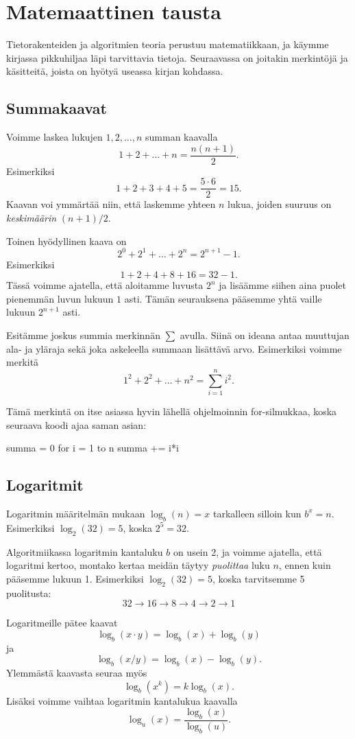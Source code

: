 \section{Matemaattinen tausta}

Tietorakenteiden ja algoritmien teoria perustuu matematiikkaan,
ja käym\-me kirjassa pikkuhiljaa läpi tarvittavia tietoja.
Seuraavassa on joitakin merkintöjä ja käsitteitä, joista on hyötyä
useassa kirjan kohdassa.

\subsection{Summakaavat}

Voimme laskea lukujen $1,2,\dots,n$ summan kaavalla
\[1+2+\dots+n = \frac{n(n+1)}{2}.\]
Esimerkiksi
\[1+2+3+4+5 = \frac{5 \cdot 6}{2}=15.\]
Kaavan voi ymmärtää niin, että laskemme yhteen $n$ lukua,
joiden suuruus on \emph{keskimäärin} $(n+1)/2$.

Toinen hyödyllinen kaava on
\[2^0+2^1+\dots+2^n = 2^{n+1}-1.\]
Esimerkiksi
\[1+2+4+8+16=32-1.\]
Tässä voimme ajatella, että aloitamme luvusta $2^n$
ja lisäämme siihen aina puolet pienemmän luvun lukuun $1$ asti.
Tämän seurauksena pääsemme yhtä vaille lukuun $2^{n+1}$ asti.

Esitämme joskus summia merkinnän $\sum$ avulla.
Siinä on ideana antaa muuttujan ala- ja yläraja sekä
joka askeleella summaan lisättävä arvo.
Esimerkiksi voimme merkitä
\[1^2 + 2^2 + \dots + n^2 = \sum_{i=1}^n i^2.\]

Tämä merkintä on itse asiassa hyvin lähellä ohjelmoinnin
for-silmukkaa, koska seuraava koodi ajaa saman asian:

\begin{code}
summa = 0
for i = 1 to n
    summa += i*i
\end{code}

\subsection{Logaritmit}

Logaritmin määritelmän mukaan $\log_b(n)=x$
tarkalleen silloin kun $b^x=n$.
Esimerkiksi $\log_2(32)=5$, koska $2^5=32$.

Algoritmiikassa logaritmin kantaluku $b$ on usein 2,
ja voimme ajatella, että logaritmi kertoo, montako kertaa
meidän täytyy \emph{puolittaa} luku $n$, ennen kuin pääsemme lukuun 1.
Esimerkiksi $\log_2(32)=5$, koska tarvitsemme 5 puolitusta:
\[32 \rightarrow 16 \rightarrow 8 \rightarrow 4 \rightarrow 2 \rightarrow 1\]

Logaritmeille pätee kaavat
\[\log_b(x \cdot y) = \log_b(x)+\log_b(y)\]
ja
\[\log_b(x / y) = \log_b(x)-\log_b(y).\]
Ylemmästä kaavasta seuraa myös
\[\log_b(x^k) = k \log_b(x).\]
Lisäksi voimme vaihtaa logaritmin kantalukua kaavalla
\[\log_u(x) = \frac{\log_b(x)}{\log_b(u)}.\]